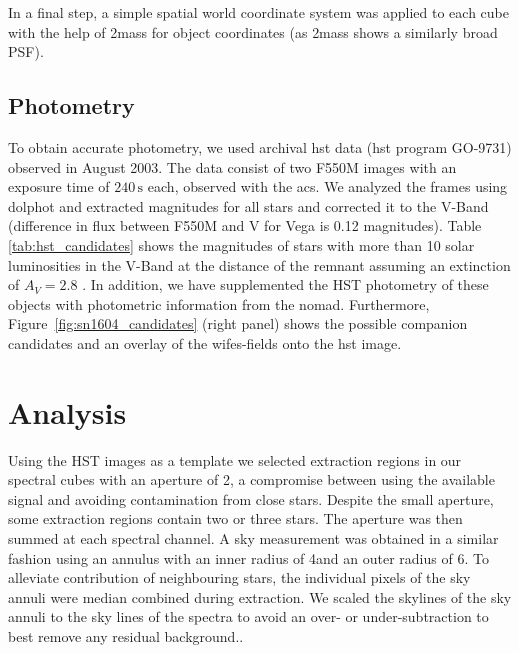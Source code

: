 \documentclass[preprint2]{aastex}
\begin{document}
In a final step, a simple spatial world coordinate system was applied to each cube with the help of \gls{2mass} for object coordinates (as \gls{2mass} shows a similarly broad PSF).



\subsection{Photometry}

To obtain accurate photometry, we used archival \gls{hst} data (\gls{hst} program GO-9731) observed in August 2003. The data consist of two F550M images with an exposure time of $240\,\textrm{s}$ each, observed with the \gls{acs}. We analyzed the frames using \gls{dolphot} and extracted magnitudes for all stars and corrected it to the V-Band (difference in flux between F550M and V for Vega is 0.12 magnitudes). Table \ref{tab:hst_candidates} shows the magnitudes of stars with more than 10 solar luminosities in the V-Band at the distance of the remnant assuming an extinction of $A_V = 2.8$ \citep{2007ApJ...668L.135R}. In addition, we have supplemented the HST photometry of these objects with photometric information from the \gls{nomad}. Furthermore, Figure~\ref{fig:sn1604_candidates}  (right panel) shows the possible companion candidates and an overlay of the \gls{wifes}-fields onto the \gls{hst} image. 







\section{Analysis}
\label{sec:analysis}
 

Using the HST images as a template we selected extraction regions in our spectral cubes with an aperture of 2\arcsec, a compromise between using the available signal and avoiding contamination from close stars. Despite the small aperture, some extraction regions contain two or three stars. The aperture was then summed at each spectral channel. A sky measurement was obtained in a similar fashion using an annulus with an inner radius of 4\arcsec and an outer radius of 6\arcsec. To alleviate contribution of neighbouring stars,  the individual pixels of the sky annuli were median combined during extraction. We scaled the skylines of the sky annuli to the sky lines of the spectra to avoid an over- or under-subtraction to best remove any residual background..
\end{document}
